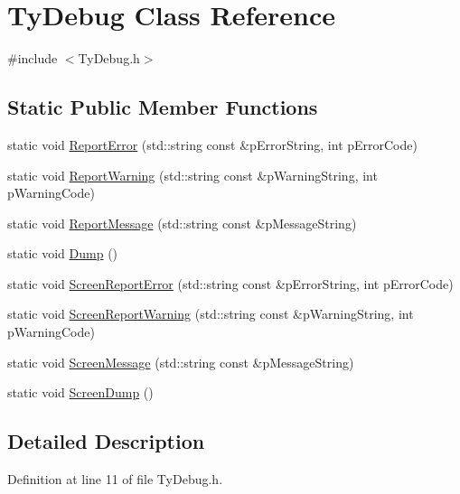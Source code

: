 \hypertarget{class_ty_debug}{
\section{TyDebug Class Reference}
\label{class_ty_debug}
}


{\ttfamily \#include $<$TyDebug.h$>$}

\subsection*{Static Public Member Functions}
\begin{DoxyCompactItemize}
\item 
static void \hyperlink{class_ty_debug_a77bf87577c601003d0d8898f34ed340c}{ReportError} (std::string const \&pErrorString, int pErrorCode)
\item 
static void \hyperlink{class_ty_debug_ab91b164af68ab77c63ad9c34d02c1605}{ReportWarning} (std::string const \&pWarningString, int pWarningCode)
\item 
static void \hyperlink{class_ty_debug_a2a5b1cfe7ab3235eb2f7ce541e8e5338}{ReportMessage} (std::string const \&pMessageString)
\item 
static void \hyperlink{class_ty_debug_a3648ae3b9ddc3a001520c91f37695279}{Dump} ()
\item 
static void \hyperlink{class_ty_debug_a713e22994cb54e62a13a6b4d30e62ae3}{ScreenReportError} (std::string const \&pErrorString, int pErrorCode)
\item 
static void \hyperlink{class_ty_debug_af91ad34c65fc57b3e6809defb5a29a26}{ScreenReportWarning} (std::string const \&pWarningString, int pWarningCode)
\item 
static void \hyperlink{class_ty_debug_a036c0341f76fe013f8447b17b65866b4}{ScreenMessage} (std::string const \&pMessageString)
\item 
static void \hyperlink{class_ty_debug_a106260a50d50164094e9f5841b711701}{ScreenDump} ()
\end{DoxyCompactItemize}


\subsection{Detailed Description}


Definition at line 11 of file TyDebug.h.



